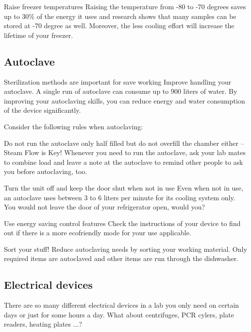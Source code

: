 \begin{suggest}{Raise freezer temperatures}
	Raising the temperature from -80 to -70 degrees saves up to 30\% of the energy it uses and research shows that many samples can be stored at -70 degree as well. Moreover, the less cooling effort will increase the lifetime of your freezer. 
\end{suggest}

\subsection{Autoclave} 
Sterilization methods are important for save working Improve handling your autoclave. A single run of autoclave can consume up to 900 liters of water. By improving your autoclaving skills, you can reduce energy and water consumption of the device significantly.
 
Consider the following rules when autoclaving:

\begin{suggest}{Do not run the autoclave only half filled but do not overfill the chamber either – Steam Flow is Key!}
	Whenever you need to run the autoclave, ask your lab mates to combine load and leave a note at the autoclave to remind other people to ask you before autoclaving, too. 

\end{suggest} 

\begin{suggest}{Turn the unit off and keep the door shut when not in use }
	Even when not in use, an autoclave uses between 3 to 6 liters per minute for its cooling system only.\\ 
	You would not leave the door of your refrigerator open, would you? 
	
\end{suggest} 

\begin{suggest}{Use energy saving control features }
	Check the instructions of your device to find out if there is a more ecofriendly mode for your use applicable.
	
\end{suggest}	

\begin{suggest}{Sort your stuff! }
	Reduce autoclaving needs by sorting your working material. Only required items are autoclaved and other items are run through the dishwasher.
\end{suggest}	

\subsection{Electrical devices}
	There are so many different electrical devices in a lab you only need on certain days or just for some hours a day. 
	What about centrifuges, PCR cylers, plate readers, heating plates ...? 
	
